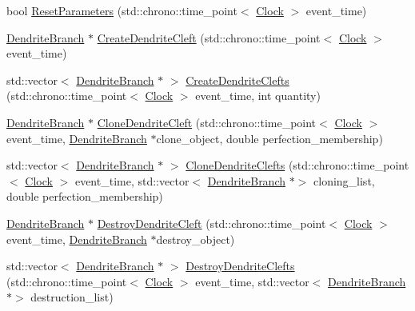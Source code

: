 \begin{DoxyCompactItemize}
\item 
bool \mbox{\hyperlink{class_dendrite_branch_a70b5e63fc44166ccd7f0c7177660c250}{Reset\+Parameters}} (std\+::chrono\+::time\+\_\+point$<$ \mbox{\hyperlink{universe_8h_a0ef8d951d1ca5ab3cfaf7ab4c7a6fd80}{Clock}} $>$ event\+\_\+time)
\item 
\mbox{\hyperlink{class_dendrite_branch}{Dendrite\+Branch}} $\ast$ \mbox{\hyperlink{class_dendrite_branch_a4f751442a537f2e3d7d0dc66a09bd84b}{Create\+Dendrite\+Cleft}} (std\+::chrono\+::time\+\_\+point$<$ \mbox{\hyperlink{universe_8h_a0ef8d951d1ca5ab3cfaf7ab4c7a6fd80}{Clock}} $>$ event\+\_\+time)
\item 
std\+::vector$<$ \mbox{\hyperlink{class_dendrite_branch}{Dendrite\+Branch}} $\ast$ $>$ \mbox{\hyperlink{class_dendrite_branch_a86d00d6ad66c8c83683e9e22d73a71b6}{Create\+Dendrite\+Clefts}} (std\+::chrono\+::time\+\_\+point$<$ \mbox{\hyperlink{universe_8h_a0ef8d951d1ca5ab3cfaf7ab4c7a6fd80}{Clock}} $>$ event\+\_\+time, int quantity)
\item 
\mbox{\hyperlink{class_dendrite_branch}{Dendrite\+Branch}} $\ast$ \mbox{\hyperlink{class_dendrite_branch_a45d2fea350165fe0c81f1f429aa96061}{Clone\+Dendrite\+Cleft}} (std\+::chrono\+::time\+\_\+point$<$ \mbox{\hyperlink{universe_8h_a0ef8d951d1ca5ab3cfaf7ab4c7a6fd80}{Clock}} $>$ event\+\_\+time, \mbox{\hyperlink{class_dendrite_branch}{Dendrite\+Branch}} $\ast$clone\+\_\+object, double perfection\+\_\+membership)
\item 
std\+::vector$<$ \mbox{\hyperlink{class_dendrite_branch}{Dendrite\+Branch}} $\ast$ $>$ \mbox{\hyperlink{class_dendrite_branch_a3cf1e07fe5e0ea827965c0dc76881c9f}{Clone\+Dendrite\+Clefts}} (std\+::chrono\+::time\+\_\+point$<$ \mbox{\hyperlink{universe_8h_a0ef8d951d1ca5ab3cfaf7ab4c7a6fd80}{Clock}} $>$ event\+\_\+time, std\+::vector$<$ \mbox{\hyperlink{class_dendrite_branch}{Dendrite\+Branch}} $\ast$$>$ cloning\+\_\+list, double perfection\+\_\+membership)
\item 
\mbox{\hyperlink{class_dendrite_branch}{Dendrite\+Branch}} $\ast$ \mbox{\hyperlink{class_dendrite_branch_a60225ab106eae6bce25eb8159166d5e9}{Destroy\+Dendrite\+Cleft}} (std\+::chrono\+::time\+\_\+point$<$ \mbox{\hyperlink{universe_8h_a0ef8d951d1ca5ab3cfaf7ab4c7a6fd80}{Clock}} $>$ event\+\_\+time, \mbox{\hyperlink{class_dendrite_branch}{Dendrite\+Branch}} $\ast$destroy\+\_\+object)
\item 
std\+::vector$<$ \mbox{\hyperlink{class_dendrite_branch}{Dendrite\+Branch}} $\ast$ $>$ \mbox{\hyperlink{class_dendrite_branch_a454dd0483439353076df63fc124a24f7}{Destroy\+Dendrite\+Clefts}} (std\+::chrono\+::time\+\_\+point$<$ \mbox{\hyperlink{universe_8h_a0ef8d951d1ca5ab3cfaf7ab4c7a6fd80}{Clock}} $>$ event\+\_\+time, std\+::vector$<$ \mbox{\hyperlink{class_dendrite_branch}{Dendrite\+Branch}} $\ast$$>$ destruction\+\_\+list)

\end{DoxyCompactItemize}

